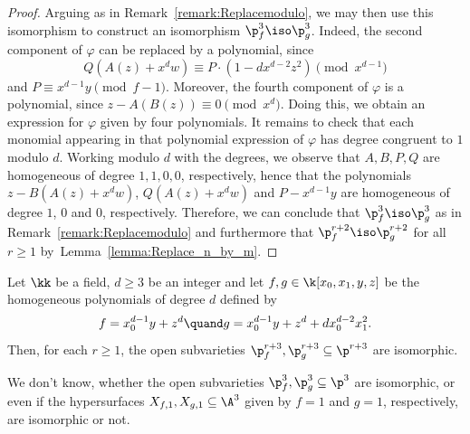 \begin{proof}
Arguing as in Remark~\ref{remark:Replacemodulo}, we may then use this isomorphism to construct an isomorphism $\p^3_f\iso \p^3_g$. Indeed, the second component of $\varphi$ can be replaced by a polynomial, since
\[
Q\left(A(z)+x^{d}w\right)\equiv P\cdot (1-dx^{d-2}z^2)\pmod{x^{d-1}}
\]
and $P\equiv x^{d-1}y\pmod{f-1}$.
Moreover, the fourth component of $\varphi$ is a polynomial, since $z-A(B(z)) \equiv 0\pmod{x^d}$.
Doing this, we obtain an expression for $\varphi$ given by four polynomials. It remains to check that each monomial appearing in that polynomial expression of $\varphi$ has degree congruent to $1$ modulo $d$. Working modulo $d$ with the degrees, we observe that $A,B,P,Q$ are homogeneous of degree $1,1,0,0$, respectively, hence that the polynomials $z-B(A(z)+x^{d}w)$, $Q(A(z)+x^dw)$ and $P-x^{d-1}y$ are homogeneous of degree $1$, $0$ and $0$, respectively. Therefore, we can conclude that $\p^3_f\iso \p^3_g$ as in Remark~\ref{remark:Replacemodulo} and furthermore that $\p^{r+2}_f\iso \p^{r+2}_g$ for all $r\geq 1$ by~Lemma~\ref{lemma:Replace_n_by_m}.
\end{proof}

\begin{proposition}
\label{Prop.Counterexample.dim4}
Let $\kk$ be a field, $d\ge 3$ be an integer and let $f,g\in\k[x_0,x_1,y,z]$ be the homogeneous polynomials of degree $d$ defined by
\[
f=x_0^{d-1}y+z^{d} \quand
g=x_0^{d-1}y+z^{d}+dx_0^{d-2}x_1^2. \]
Then, for each $r\ge 1$, the open subvarieties $\p^{r+3}_f,\p^{r+3}_g \subseteq \p^{r+3}$ are isomorphic.
\end{proposition}

\begin{remark}
We don't know, whether the open subvarieties $\p^{3}_f,\p^{3}_g \subseteq \p^{3}$ are isomorphic,
or even if the hypersurfaces $X_{f,1}, X_{g,1}\subseteq \A^3$ given by $f=1$ and $g=1$, respectively, are isomorphic or not.
\end{remark}

